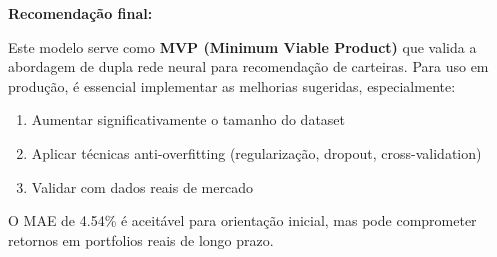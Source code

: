 \documentclass[12pt]{article}
\begin{document}
\textbf{Recomendação final:}

Este modelo serve como \textbf{MVP (Minimum Viable Product)} que valida a abordagem de dupla rede neural para recomendação de carteiras. Para uso em produção, é essencial implementar as melhorias sugeridas, especialmente:
\begin{enumerate}
    \item Aumentar significativamente o tamanho do dataset
    \item Aplicar técnicas anti-overfitting (regularização, dropout, cross-validation)
    \item Validar com dados reais de mercado
\end{enumerate}

O MAE de 4.54\% é aceitável para orientação inicial, mas pode comprometer retornos em portfolios reais de longo prazo.
\end{document}

